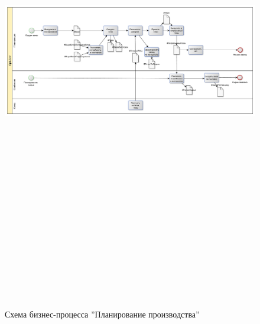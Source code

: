 \begin{figure}[!htb]
\centering
  \includegraphics[width=200mm, height=220mm, angle=90, keepaspectratio]{50_Pics/3 Plan.pdf}
\caption{Схема бизнес-процесса ''Планирование производства''}
\label{pic:3_Planning}
\end{figure} 

\clearpage


